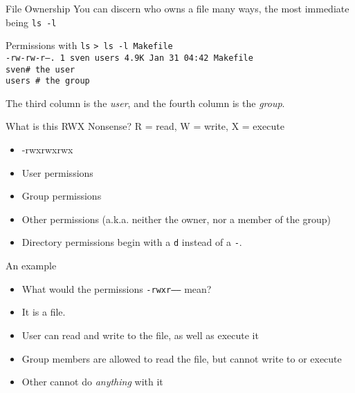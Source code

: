 \documentclass[11pt]{beamer}
\newcommand{\colbf}[1]{\textcolor{mLightBrown!77!black}{#1}}%
\def\wl{\par \vspace{\baselineskip}}                        %
\begin{document}
\begin{frame}[fragile]{File Ownership}
  You can discern who owns a file many ways, the most immediate being \texttt{ls -l}\wl

  \begin{block}{Permissions with \texttt{ls}}
    {\small
    \texttt{> ls -l Makefile}\\
    \texttt{-rw-rw-r--. 1 sven users 4.9K Jan 31 04:42 Makefile}\\
    \texttt{\hphantom{-rw-rw-r--. 1 }\colbf{sven}\hphantom{ users }\# the user}\\
    \texttt{\hphantom{-rw-rw-r--. 1 sven }\colbf{users }\# the group}\\
    }
  \end{block}

  The third column is the \emph{user}, and the fourth column is the \emph{group}.
\end{frame}

\begin{frame}[fragile]{What is this RWX Nonsense?}
  R = read, W = write, X = execute\wl
  \begin{itemize}[<+- | alert@+>]
    \item[] \hspace*{-4ex}-\alert<2>{rwx}\alert<3>{rwx}\alert<4>{rwx}
    \item User permissions
    \item Group permissions
    \item Other permissions (a.k.a. neither the owner, nor a member of the group)
    \item[] \hspace*{-4ex}Directory permissions begin with a \texttt{d} instead of a \texttt{-}.
  \end{itemize}

\end{frame}

\begin{frame}[fragile]{An example}
  \begin{itemize}[<+- | alert@+>]
    \item[] \hspace*{-4ex}What would the permissions \texttt{-rwxr-----} mean?\wl
    \item It is a file.
    \item User can read and write to the file, as well as execute it
    \item Group members are allowed to read the file, but cannot write to or execute
    \item Other cannot do \emph{anything} with it
  \end{itemize}
\end{frame}
\end{document}
